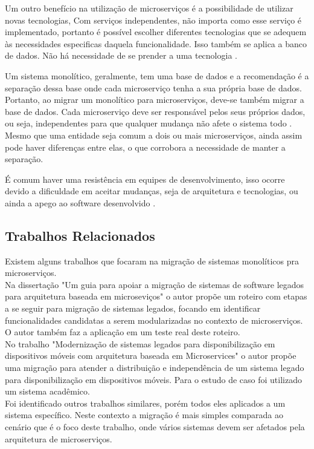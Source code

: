 \documentclass[12pt]{article}
\begin{document}
Um outro benefício na utilização de microserviços é a possibilidade de utilizar novas tecnologias, Com serviços independentes, não importa como esse serviço é implementado, portanto é possível escolher diferentes tecnologias que se adequem às necessidades especificas daquela funcionalidade. Isso também se aplica a banco de dados. Não há necessidade de se prender a uma tecnologia \cite{Richter2017a}.


Um sistema monolítico, geralmente, tem uma base de dados e a recomendação é a separação dessa base onde cada microserviço tenha a sua própria base de dados. Portanto, ao migrar um monolítico para microserviços, deve-se também migrar a base de dados. Cada microserviço deve ser responsável pelos seus próprios dados, ou seja, independentes para que qualquer mudança não afete o sistema todo \cite{Kholy2019}. Mesmo que uma entidade seja comum a dois ou mais microserviços, ainda assim pode haver diferenças entre elas, o que corrobora a necessidade de manter a separação.

É comum haver uma resistência em equipes de desenvolvimento, isso ocorre devido a dificuldade em aceitar mudanças, seja de arquitetura e tecnologias, ou ainda a apego ao software desenvolvido \cite{Taibi}.


\subsection{Trabalhos Relacionados}
Existem alguns trabalhos que focaram na migração de sistemas monolíticos pra microserviços.
\\Na dissertação "Um guia para apoiar a migração de sistemas de software legados para arquitetura baseada em microseviços"\hspace{0.05cm} o autor propõe um roteiro com etapas a se seguir para migração de sistemas legados, focando em identificar funcionalidades candidatas a serem modularizadas no contexto de microserviços. O autor também faz a aplicação em um teste real deste roteiro.
\\No trabalho "Modernização de sistemas legados para disponibilização em dispositivos móveis com arquitetura baseada em Microservices" o autor propõe uma migração para atender a distribuição e independência de um sistema legado para disponibilização em dispositivos móveis. Para o estudo de caso foi utilizado um sistema acadêmico.
\\Foi identificado outros trabalhos similares, porém todos eles aplicados a um sistema específico. Neste contexto a migração é mais simples comparada ao cenário que é o foco deste trabalho, onde vários sistemas devem ser afetados pela arquitetura de microserviços.
\end{document}
